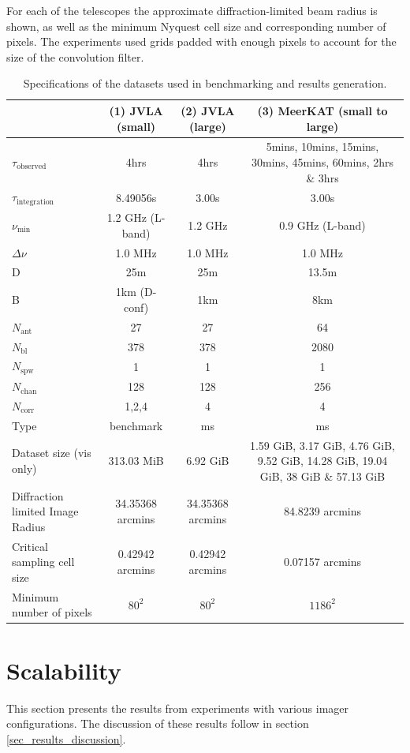 For each of the telescopes the approximate diffraction-limited beam radius is shown, as well as the minimum Nyquest cell size and corresponding number of pixels. The experiments used grids padded
with enough pixels to account for the size of the convolution filter.
\begin{table}[ht]
  \centering
  \begin{tabular}[c]{|p{4cm}||c|c|c|}
  \hline
  & (1) JVLA (small) & (2) JVLA (large) & (3) MeerKAT (small to large)\\
  \hline
  $\tau_\text{observed}$ & 4hrs & 4hrs & \multicolumn{1}{m{4cm}|}{5mins, 10mins, 15mins, 30mins, 45mins, 60mins, 2hrs \& 3hrs}\\
  \hline
  $\tau_\text{integration}$ & 8.49056s & 3.00s & 3.00s\\
  \hline
  $\nu_\text{min}$ & 1.2 GHz (L-band) & 1.2 GHz & 0.9 GHz (L-band)\\
  \hline
  $\Delta{\nu}$ & 1.0 MHz & 1.0 MHz & 1.0 MHz\\
  \hline
  D & 25m & 25m & 13.5m\\
  \hline
  B & 1km (D-conf) & 1km & 8km\\
  \hline
  $N_\text{ant}$ & 27 & 27 & 64\\
  \hline
  $N_\text{bl}$ & 378 & 378 & 2080\\
  \hline
  $N_\text{spw}$ & 1 & 1 & 1\\
  \hline
  $N_\text{chan}$ & 128 & 128 & 256\\
  \hline
  $N_\text{corr}$ & 1,2,4 & 4 & 4\\
  \hline
  Type & benchmark & ms & ms\\
  \hline
  Dataset size (vis only) & 313.03 MiB & 6.92 GiB & \multicolumn{1}{m{4cm}|}{1.59 GiB, 3.17 GiB, 4.76 GiB, 9.52 GiB, 14.28 GiB, 19.04 GiB, 38 GiB \& 57.13 GiB} \\
  \hline
  Diffraction limited Image Radius & 34.35368 arcmins & 34.35368 arcmins & 84.8239 arcmins\\
  \hline
  Critical sampling cell size & 0.42942 arcmins & 0.42942 arcmins & 0.07157 arcmins\\
  \hline
  Minimum number of pixels & $80^2$ & $80^2$ & $1186^2$\\
  \hline
  \end{tabular}
  \caption[Benchmarking datasets]{Specifications of the datasets used in benchmarking and results generation.}
  \label{tbl_datasets}
\end{table}

\section{Scalability}
This section presents the results from experiments with various imager configurations. The discussion of these results
follow in section \ref{sec_results_discussion}.
